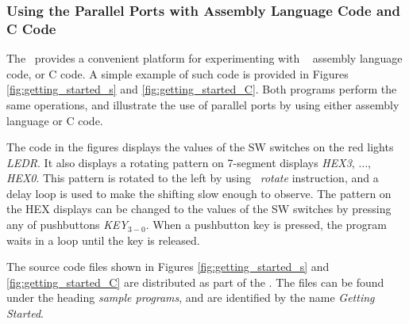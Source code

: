 \subsubsection{Using the Parallel Ports with Assembly Language Code and C Code}

The \systemName~provides a convenient platform for experimenting with \processor~
assembly language code, or C code.  A simple example of such code is provided in 
Figures \ref{fig:getting_started_s} and \ref{fig:getting_started_C}. Both programs
perform the same operations, and illustrate the use of parallel ports by using either 
assembly language or C code.

The code in the figures displays the values of the SW switches on the red lights {\it LEDR}.
It also displays a rotating pattern on 7-segment displays {\it HEX3}, $\ldots$, {\it HEX0}. 
This pattern is rotated to the left by using \aProcessor~{\it rotate} instruction, and a delay loop 
is used to make the shifting slow enough to observe. The pattern on the HEX displays
can be changed to the values of the SW switches by pressing any of 
pushbuttons {\it KEY}$_{3-0}$.
When a pushbutton key is pressed, the program waits in a loop until the key is released.

The source code files shown in Figures \ref{fig:getting_started_s} and \ref{fig:getting_started_C}
are distributed as part of the  
\productNameMed{}. The files can be found under the heading {\it sample programs}, 
and are identified by the name {\it Getting Started}.

